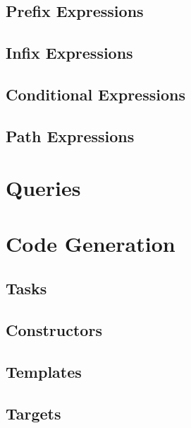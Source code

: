 \documentclass[a4paper,oneside,12pt, extrafontsizes]{memoir}
\theoremstyle{definition}
\theoremstyle{definition}
\theoremstyle{definition}
\theoremstyle{definition}
\theoremstyle{definition}
\begin{document}
\section{Prefix Expressions}
\label{sec:prefix}


\section{Infix Expressions}
\label{sec:infix}


\section{Conditional Expressions}
\label{sec:conditionals}


\section{Path Expressions}
\label{sec:paths}


\chapter{Queries}
\label{ch:queries}


\chapter{Code Generation}
\label{ch:codegen}

\section{Tasks}
\label{sec:tasks}

\section{Constructors}
\label{sec:constructors}

\section{Templates}
\label{sec:templates}

\section{Targets}
\label{sec:targets}
\end{document}
